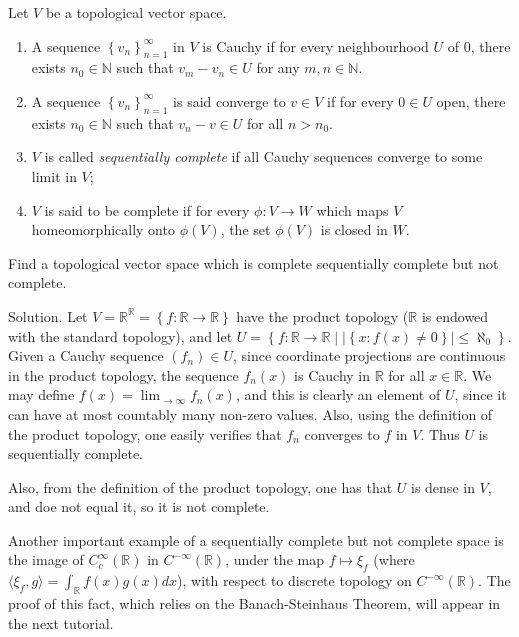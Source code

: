 \documentclass[12pt, reqno,a4paper, twoside]{amsproc}
\newcommand{\dbN}{\mathbb N}
\newcommand{\dbR}{\mathbb R}
\newcommand{\gen}[1]{\langle{#1}\rangle}
\newcommand{\set}[1]{\left\{{#1}\right\}}
\newcommand{\abs}[1]{\left|#1\right|}
\newenvironment{sol}{\sc Solution. \rm}{\hfill \qedsymbol\bigskip}
\begin{document}
\begin{defi}
	Let $V$ be a topological vector space. 
	\begin{enumerate}
		\item A sequence $\set{v_n}_{n=1}^\infty$ in $V$ is Cauchy if for every neighbourhood $U$ of $0$, there exists $n_0\in \dbN$ such that $v_m-v_n\in U$ for any $m,n\in \dbN$.%
		\item A sequence $\set{v_n}_{n=1}^\infty$ is said converge to $v\in V$ if for every $0\in U$ open, there exists $n_0\in \dbN$ such that $v_n-v\in U$ for all $n>n_0$. 
		\item $V$ is called \emph{sequentially complete} if all Cauchy sequences converge to some limit in $V$;
		\item  $V$ is said to be complete if for every $\phi:V\to W$ which maps $V$ homeomorphically onto $\phi(V)$, the set $\phi(V)$ is closed in $W$.		
	\end{enumerate}
\end{defi}
\begin{exer}
	Find a topological vector space which is complete sequentially complete but not complete.
\end{exer}
\begin{sol}
	Let $V=\dbR^\dbR=\set{f:\dbR\to\dbR}$ have the product topology ($\dbR$ is endowed with the standard topology), and let $U=\set{f:\dbR\to\dbR\mid \abs{\set{x:f(x)\ne 0}}\le \aleph_0}$. Given a Cauchy sequence $(f_n)\in U$, since coordinate projections are continuous in the product topology, the sequence $f_n(x)$ is Cauchy in $\dbR$ for all $x\in \dbR$. We may define $f(x)=\lim_{\to\infty}f_n(x)$, and this is clearly an element of $U$, since it can have at most countably many non-zero values. Also, using the definition of the product topology, one easily verifies that $f_n$ converges to $f$ in $V$. Thus $U$ is sequentially complete. 
	
	Also, from the definition of the product topology, one has that $U$ is dense in $V$, and doe not equal it, so it is not complete. 
\end{sol}

\begin{rem}
	Another important example of a sequentially complete but not complete space is the image of $C_c^{\infty}(\dbR)$ in $C^{-\infty}(\dbR)$, under the map $f\mapsto \xi_f$ (where $\gen{\xi_f,g}=\int_\dbR f(x)g(x)dx$), with respect to discrete topology on $C^{-\infty}(\dbR)$. The proof of this fact, which relies on the Banach-Steinhaus Theorem, will appear in the next tutorial.
\end{rem}
\end{document}
